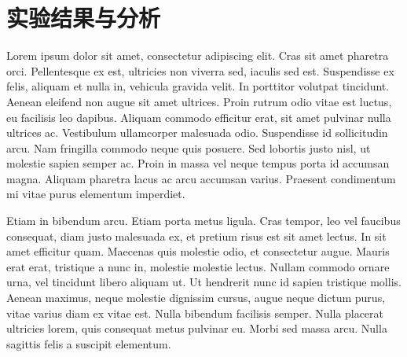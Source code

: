 \documentclass{zjureport}
\begin{document}
\section{实验结果与分析}

Lorem ipsum dolor sit amet, consectetur adipiscing elit. Cras sit amet pharetra orci. Pellentesque ex est, ultricies non viverra sed, iaculis sed est. Suspendisse ex felis, aliquam et nulla in, vehicula gravida velit. In porttitor volutpat tincidunt. Aenean eleifend non augue sit amet ultrices. Proin rutrum odio vitae est luctus, eu facilisis leo dapibus. Aliquam commodo efficitur erat, sit amet pulvinar nulla ultrices ac. Vestibulum ullamcorper malesuada odio. Suspendisse id sollicitudin arcu. Nam fringilla commodo neque quis posuere. Sed lobortis justo nisl, ut molestie sapien semper ac. Proin in massa vel neque tempus porta id accumsan magna. Aliquam pharetra lacus ac arcu accumsan varius. Praesent condimentum mi vitae purus elementum imperdiet.

Etiam in bibendum arcu. Etiam porta metus ligula. Cras tempor, leo vel faucibus consequat, diam justo malesuada ex, et pretium risus est sit amet lectus. In sit amet efficitur quam. Maecenas quis molestie odio, et consectetur augue. Mauris erat erat, tristique a nunc in, molestie molestie lectus. Nullam commodo ornare urna, vel tincidunt libero aliquam ut. Ut hendrerit nunc id sapien tristique mollis. Aenean maximus, neque molestie dignissim cursus, augue neque dictum purus, vitae varius diam ex vitae est. Nulla bibendum facilisis semper. Nulla placerat ultricies lorem, quis consequat metus pulvinar eu. Morbi sed massa arcu. Nulla sagittis felis a suscipit elementum.
\end{document}
